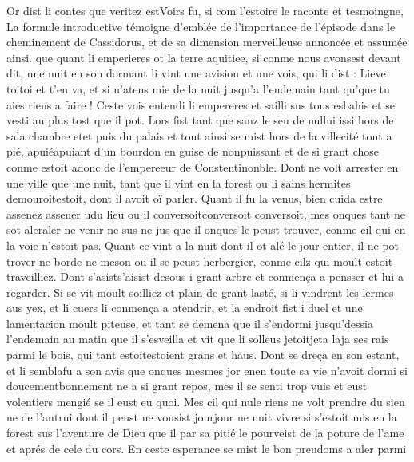 \documentclass{article}
\begin{document}
\begin{pages}
            
\pstart Or dist li contes que veritez 
   estVoirs fu, 
   si com l’estoire le raconte et tesmoingne,
   La formule introductive témoigne d'emblée de l'importance de l'épisode dans le cheminement de Cassidorus,
   et de sa dimension merveilleuse annoncée et assumée ainsi.
   que quant li emperieres ot la terre aquitiee, 
   si conme nous avonsest devant dit, 
   une nuit en son dormant li vint une avision et une vois, qui li dist :
   Lieve 
      toitoi et t’en va, 
      et si n’atens mie de la nuit jusqu’a l’endemain 
      tant qu’que tu aies riens a faire
          !
   Ceste vois entendi li empereres et sailli sus tous esbahis et se vesti au plus tost que il pot. 
   Lors fist tant que sanz le seu de nullui issi hors de sala 
   chambre etet puis du palais et 
   tout ainsi se mist hors de 
   la villecité tout a pié, 
   apuiéapuiant d’un bourdon en guise de nonpuissant et de si grant chose 
   conme estoit adonc de l’empereeur de Constentinonble. 
   Dont ne volt arrester en une ville que une nuit, 
   tant que il vint en la forest 
   ou li sains hermites 
   demouroitestoit, 
   dont il avoit oï parler. Quant il fu la venus, bien cuida estre assenez assener
   udu lieu ou il 
   conversoitconversoit conversoit, 
   mes onques tant ne sot aleraler ne venir 
   ne sus ne jus que il onques le peust trouver, 
   conme cil qui en la voie n’estoit pas. Quant ce vint a la nuit dont il ot alé le jour entier, 
   il ne pot trover ne borde ne meson ou il se peust herbergier, conme cilz qui moult estoit traveilliez. 
   Dont s'asists’aisist desous 
   i grant arbre et conmença a pensser et lui a regarder. Si se vit moult soilliez 
   et plain de grant lasté, si li vindrent les lermes aus yex, et li cuers li conmença a atendrir, 
   et la endroit fist i duel et une lamentacion moult piteuse, 
   et tant se demena que il s’endormi jusqu’dessia 
   l’endemain au matin que il s’esveilla 
   et vit que li solleus jetoitjeta 
   laja ses rais parmi le bois, qui tant 
   estoitestoient grans et haus. 
   Dont se dreça en son estant, et li semblafu 
   a son avis que 
   onques mesmes jor 
      enen toute sa vie n’avoit dormi si 
      doucementbonnement ne a si grant repos, 
   mes il se senti trop vuis et eust volentiers mengié se il eust eu quoi. Mes cil qui nule riens ne volt prendre du sien 
   ne de l’autrui dont il peust ne vousist 
   jourjour ne nuit vivre si s’estoit mis 
   en la forest sus 
   l’aventure de Dieu que il par sa pitié le pourveist de la poture de l’ame 
   et aprés de cele du cors. En ceste esperance se mist le bon preudoms a aler parmi 

\end{pages}
\end{document}
